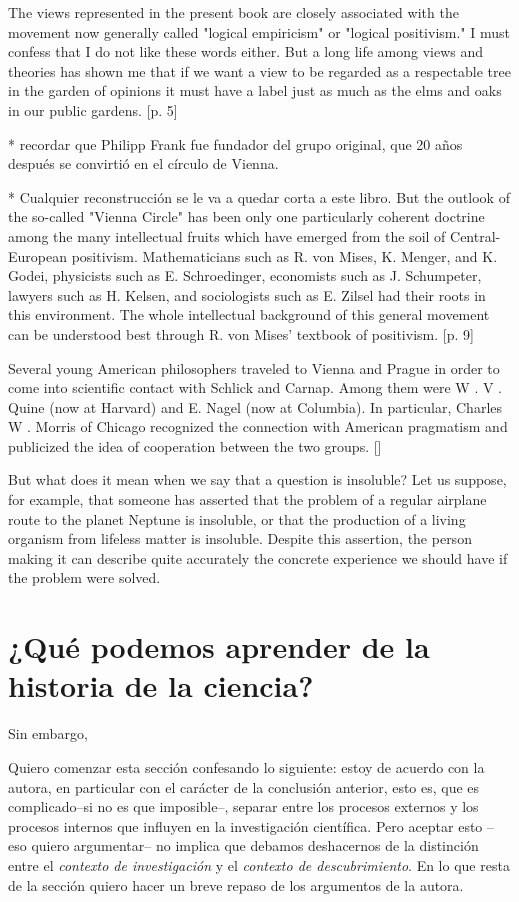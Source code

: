 The views represented in the present book are closely associated with the movement now generally  called "logical empiricism" or "logical positivism."
I must confess that I do not like these words either.
But a long life among views and theories has shown me that if we want a view to be regarded as a respectable tree in the garden of opinions it must have a label just as much as the elms and oaks in our public gardens. [p. 5]

* recordar que Philipp Frank fue fundador del grupo original, que 20 años después se convirtió en el círculo de Vienna.

* Cualquier reconstrucción se le va a quedar corta a este libro.
But the outlook of the so-called "Vienna Circle"  has been only one particularly coherent doctrine  among the many intellectual fruits which have  emerged from the soil of Central-European positivism. Mathematicians such as R. von Mises, Κ. Menger, and Κ. Godei, physicists such as E. Schroedinger,  economists such as J. Schumpeter, lawyers such as  H. Kelsen, and sociologists such as E. Zilsel had their  roots in this environment. The whole intellectual  background of this general movement can be understood best through R. von Mises' textbook of positivism. [p. 9]

Several young American philosophers  traveled to Vienna and Prague in order to come into  scientific contact with Schlick and Carnap. Among  them were W . V . Quine (now at Harvard) and  E. Nagel (now at Columbia). In particular, Charles  W . Morris of Chicago recognized the connection  with American pragmatism and publicized the idea  of cooperation between the two groups. []

But what does it mean when we say that a question  is insoluble? Let us suppose, for example, that someone has asserted that the problem of a regular airplane  route to the planet Neptune is insoluble, or that the  production of a living organism from lifeless matter  is insoluble. Despite this assertion, the person making  it can describe quite accurately the concrete experience we should have if the problem were solved.

\section{¿Qué podemos aprender de la historia de la ciencia?}

\noindent Sin embargo,

\noindent Quiero comenzar esta sección confesando lo siguiente: estoy de acuerdo con la autora, en particular con el carácter de la conclusión anterior, esto es, que es complicado--si no es que imposible--, separar entre los procesos externos y los procesos internos que influyen en la investigación científica.
Pero aceptar esto --eso quiero argumentar-- no implica que debamos deshacernos de la distinción entre el \emph{contexto de investigación} y el \emph{contexto de descubrimiento}.
En lo que resta de la sección quiero hacer un breve repaso de los argumentos de la autora.

